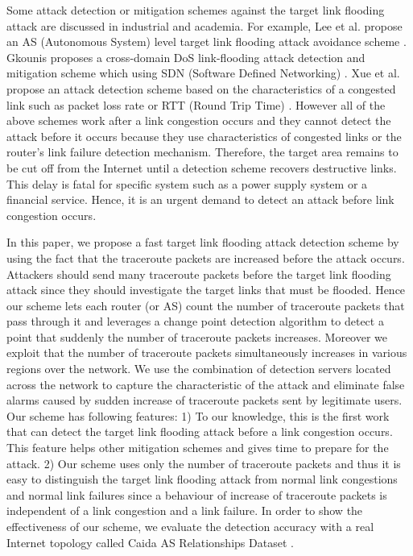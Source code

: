 \documentclass[conference]{IEEEtran}
\begin{document}
    Some attack detection or mitigation schemes against the target link flooding attack are discussed in industrial and academia.
    For example, Lee et al. propose an AS (Autonomous System) level target link flooding attack avoidance scheme \cite{CoDef}.
    Gkounis proposes a cross-domain DoS link-flooding attack detection and mitigation scheme which using SDN (Software Defined Networking) \cite{crossdomain}.
    Xue et al. propose an attack detection scheme based on the characteristics of a congested link such as packet loss rate or RTT (Round Trip Time) \cite{DetectTLFA}.
    However all of the above schemes work after a link congestion occurs and they cannot detect the attack before it occurs because they use characteristics of congested links or the router's link failure detection mechanism.
    Therefore, the target area remains to be cut off from the Internet until a detection scheme recovers destructive links.
    This delay is fatal for specific system such as a power supply system or a financial service.
    Hence, it is an urgent demand to detect an attack before link congestion occurs.
   
    In this paper, we propose a fast target link flooding attack detection scheme by using the fact that the traceroute packets are increased before the attack occurs.
    Attackers should send many traceroute packets before the target link flooding attack since they should investigate the target links that must be flooded.
    Hence our scheme lets each router (or AS) count the number of traceroute packets that pass through it and leverages a change point detection algorithm to detect a point that suddenly the number of traceroute packets increases.
    Moreover we exploit that the number of traceroute packets simultaneously increases in various regions over the network.
    We use the combination of detection servers located across the network to capture the characteristic of the attack and eliminate false alarms caused by sudden increase of traceroute packets sent by legitimate users.
    Our scheme has following features:
    1) To our knowledge, this is the first work that can detect the target link flooding attack before a link congestion occurs.
    This feature helps other mitigation schemes and gives time to prepare for the attack.
    2) Our scheme uses only the number of traceroute packets and thus it is easy to distinguish the target link flooding attack from normal link congestions and normal link failures since a behaviour of increase of traceroute packets is independent of a link congestion and a link failure.
    In order to show the effectiveness of our scheme, we evaluate the detection accuracy with a real Internet topology called Caida AS Relationships Dataset \cite{as-relation}.
\end{document}
